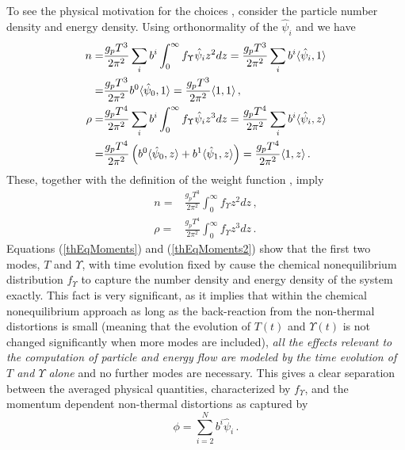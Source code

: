 To see the physical motivation for the choices , consider the particle number density and energy density.  Using orthonormality of the $\hat\psi_i$ and  we have
\begin{align}
n=&\frac{g_pT^3}{2\pi^2}\sum_ib^i\int_0^\infty f_\Upsilon  \hat\psi_i z^2 dz=\frac{g_pT^3}{2\pi^2}\sum_ib^i\langle \hat\psi_i ,1\rangle\\
=&\frac{g_pT^3}{2\pi^2}b^0\langle \hat\psi_0 ,1\rangle=\frac{g_pT^3}{2\pi^2}\langle 1 ,1\rangle\,,\notag\\
\rho=&\frac{g_pT^4}{2\pi^2}\sum_ib^i\int_0^\infty f_\Upsilon  \hat\psi_i z^3 dz=\frac{g_pT^4}{2\pi^2}\sum_ib^i\langle\hat\psi_i, z\rangle\\
=&\frac{g_pT^4}{2\pi^2}\left(b^0\langle\hat\psi_0, z\rangle+b^1\langle\hat\psi_1, z\rangle\right)=
\frac{g_pT^4}{2\pi^2}\langle 1,z\rangle\,.\notag
\end{align}
These, together with the definition of the weight function , imply
\begin{align}\label{thEqMoments}
n=&\frac{g_pT^3}{2\pi^2}\int_0^\infty f_\Upsilon  z^2dz\,,\\
\label{thEqMoments2}
\rho=&\frac{g_pT^4}{2\pi^2}\int_0^\infty f_\Upsilon  z^3dz\,.
\end{align}
Equations (\ref{thEqMoments}) and (\ref{thEqMoments2}) show  that the first two modes, $T$ and $\Upsilon$, with time evolution fixed by  cause the chemical nonequilibrium distribution $f_\Upsilon $ to capture the number density and energy density of the system exactly.  This fact is very significant, as it implies that within the chemical nonequilibrium approach as long as the back-reaction from the non-thermal distortions is small (meaning that the evolution of $T(t)$ and $\Upsilon(t)$ is not changed significantly when more modes are included), {\em all the effects relevant to the computation of  particle and energy flow are modeled by the time evolution of $T$ and $\Upsilon$ alone} and no further modes are necessary.  This gives a clear separation between the averaged physical quantities, characterized by $f_\Upsilon $, and the momentum dependent non-thermal distortions as captured by 
\begin{equation}
\phi=\sum_{i=2}^N b^i\hat\psi_i\,.
\end{equation}

